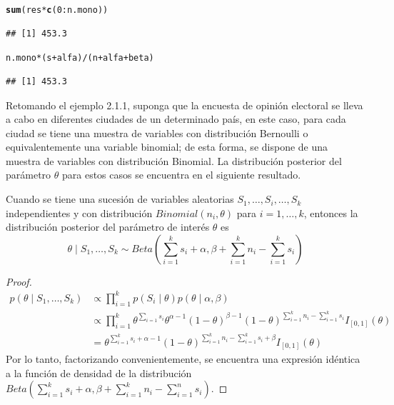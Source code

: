 \documentclass[10pt,openright]{book}\usepackage[]{graphicx}\usepackage[]{color}
\makeatletter
\newcommand{\hlnum}[1]{\textcolor[rgb]{0.686,0.059,0.569}{#1}}%
\newcommand{\hlopt}[1]{\textcolor[rgb]{0,0,0}{#1}}%
\newcommand{\hlstd}[1]{\textcolor[rgb]{0.345,0.345,0.345}{#1}}%
\newcommand{\hlkwd}[1]{\textcolor[rgb]{0.737,0.353,0.396}{\textbf{#1}}}%
\newenvironment{kframe}{%
 \def\at@end@of@kframe{}%
 \ifinner\ifhmode%
  \def\at@end@of@kframe{\end{minipage}}%
  \begin{minipage}{\columnwidth}%
 \fi\fi%
 \def\FrameCommand##1{\hskip\@totalleftmargin \hskip-\fboxsep
 \colorbox{shadecolor}{##1}\hskip-\fboxsep
     \hskip-\linewidth \hskip-\@totalleftmargin \hskip\columnwidth}%
 \MakeFramed {\advance\hsize-\width
   \@totalleftmargin\z@ \linewidth\hsize
   \@setminipage}}%
 {\par\unskip\endMakeFramed%
 \at@end@of@kframe}
\newenvironment{knitrout}{}{} %
\makeatother
\begin{document}
\begin{knitrout}
\color{fgcolor}\begin{kframe}
\begin{alltt}
\hlkwd{sum}\hlstd{(res}\hlopt{*}\hlkwd{c}\hlstd{(}\hlnum{0}\hlopt{:}\hlstd{n.mono))}
\end{alltt}
\begin{verbatim}
## [1] 453.3
\end{verbatim}
\begin{alltt}
\hlstd{n.mono}\hlopt{*}\hlstd{(s}\hlopt{+}\hlstd{alfa)}\hlopt{/}\hlstd{(n}\hlopt{+}\hlstd{alfa}\hlopt{+}\hlstd{beta)}
\end{alltt}
\begin{verbatim}
## [1] 453.3
\end{verbatim}
\end{kframe}
\end{knitrout}
    
    Retomando el ejemplo 2.1.1, suponga que la encuesta de opini\'on electoral se lleva a cabo en diferentes ciudades de un determinado pa\'is, en este caso, para cada ciudad se tiene una muestra de variables con distribuci\'on Bernoulli o equivalentemente una variable binomial; de esta forma, se dispone de una muestra de variables con distribuci\'on Binomial. La distribuci\'on posterior del par\'ametro $\theta$ para estos casos se encuentra en el siguiente resultado.
    
    \begin{Res}\label{Res_theta_Binomial}
    Cuando se tiene una sucesi\'on de variables aleatorias $S_1,\ldots,S_i, \ldots,S_k$ independientes y con distribuci\'on $Binomial(n_i,\theta)$ para $i=1,\ldots,k$, entonces la distribuci\'on posterior del par\'ametro de inter\'es $\theta$ es
    \begin{equation*}
    \theta \mid S_1,\ldots,S_k \sim Beta\left(\sum_{i=1}^ks_i+\alpha,\beta+\sum_{i=1}^k n_i-\sum_{i=1}^k s_i\right)
    \end{equation*}
    \end{Res}
    
    \begin{proof}
    \begin{align*}
    p(\theta \mid S_1,\ldots,S_k)&\propto \prod_{i=1}^kp(S_i \mid \theta)p(\theta \mid \alpha,\beta)\\
    &\propto \prod_{i=1}^k\theta^{\sum_{i=1}s_i}\theta^{\alpha-1}(1-\theta)^{\beta-1}
    (1-\theta)^{\sum_{i=1}^kn_i-\sum_{i=1}^ks_i}I_{[0,1]}(\theta)\\
    &= \theta^{\sum_{i=1}^ks_i+\alpha-1}(1-\theta)^{\sum_{i=1}^kn_i-\sum_{i=1}^ks_i+\beta}I_{[0,1]}(\theta)
    \end{align*}
    Por lo tanto, factorizando convenientemente, se encuentra una expresi\'on id\'entica a la funci\'on de densidad de la distribuci\'on $Beta\left(\sum_{i=1}^ks_i+\alpha,\beta+\sum_{i=1}^k n_i-\sum_{i=1}^n s_i\right)$.
    \end{proof}
    
\end{document}
